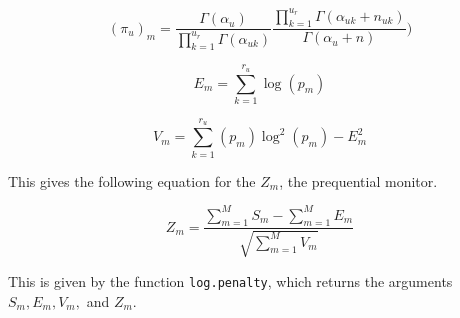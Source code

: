 \documentclass[12pt]{article}
\begin{document}
\begin{equation}
(\pi_u)_m= \frac{\Gamma(\alpha_u)}{\prod_{k=1}^{u_r} \Gamma(\alpha_{uk})} \frac{\prod_{k=1}^{u_r}\Gamma(\alpha_{uk} + n_{uk})}{\Gamma(\alpha_u + n)})
\end{equation}

\begin{equation}
E_m = \sum_{k=1}^{r_u}  \log (p_m)
\end{equation} 

\begin{equation}
V_m = \sum_{k=1}^{r_u} (p_m) \log^2 (p_m) - E_m^2
\end{equation}

This gives the following equation for the $Z_m$, the prequential monitor. 

\[
Z_m = \frac{\sum_{m=1}^{M} S_m - \sum_{m=1}^{M} E_m}{\sqrt{\sum_{m=1}^{M} V_m}}
\]

This is given by the function \texttt{log.penalty}, which returns the arguments $S_m, E_m, V_m,$ and $Z_m$.

%
%
%
%
%
%
%
%
% 
%
%
%
%
\end{document}
